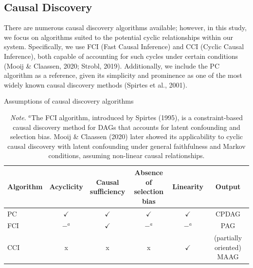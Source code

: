 \documentclass[
]{article}
\begin{document}
\subsection{Causal Discovery}\label{causal-discovery}

There are numerous causal discovery algorithms available; however, in
this study, we focus on algorithms suited to the potential cyclic
relationships within our system. Specifically, we use FCI (Fast Causal
Inference) and CCI (Cyclic Causal Inference), both capable of accounting
for such cycles under certain conditions (Mooij \& Claassen, 2020;
Strobl, 2019). Additionally, we include the PC algorithm as a reference,
given its simplicity and prominence as one of the most widely known
causal discovery methods (Spirtes et al., 2001).

\begin{table}[ht]
\centering
\small %
\caption{Assumptions of causal discovery algorithms}
\begin{tabular}{lccccc}
\toprule
Algorithm & Acyclicity & \makecell{Causal \\ sufficiency} & 
\makecell{Absence of \\ selection bias} & Linearity & Output \\ 
\midrule
PC  & $\checkmark$ & $\checkmark$ & $\checkmark$ & $\checkmark$ & CPDAG \\ 
FCI & $-^{a}$ & $\checkmark$ & $-^{a}$ & $-^{a}$ & PAG \\ 
CCI & x & x & x & $\checkmark$ & \makecell{\footnotesize(partially oriented) \\ MAAG} \\ 
\bottomrule
\end{tabular}
\caption*{\footnotesize{\textit{Note}. $^{a}$The FCI algorithm, introduced by Spirtes (1995), is a constraint-based causal discovery method for DAGs that accounts for latent confounding and selection bias. Mooij \& Claassen (2020) later showed its applicability to cyclic causal discovery with latent confounding under general faithfulness and Markov conditions, assuming non-linear causal relationships.}}
\end{table}
\end{document}
